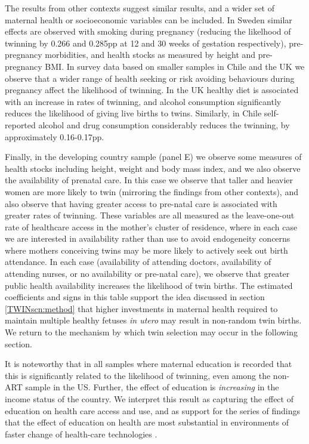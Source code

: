 \documentclass[subeqn]{article}
\begin{document}
\begin{spacing}{1.4}
The results from other contexts suggest similar results, and a wider set of
maternal health or socioeconomic variables can be included.  In Sweden similar
effects are observed with smoking during pregnancy (reducing the likelhood of
twinning by 0.266 and 0.285pp at 12 and 30 weeks of gestation respectively),
pre-pregnancy morbidities, and health stocks as measured by height and pre-%
pregnancy BMI.  In survey data based on smaller samples in Chile and the UK
we observe that a wider range of health seeking or risk avoiding behaviours
during pregnancy affect the likelihood of twinning.  In the UK healthy diet
is associated with an increase in rates of twinning, and alcohol consumption
significantly reduces the likelihood of giving live births to twins. Similarly,
in Chile self-reported alcohol and drug consumption considerably reduces the
twinning, by approximately 0.16-0.17pp.

Finally, in the developing country sample (panel E) we observe some measures of
health stocks including height, weight and body mass index, and we also observe
the availability of prenatal care.  In this case we observe that taller and
heavier women are more likely to twin (mirroring the findings from other
contexts), and also observe that having greater access to pre-natal care is
associated with greater rates of twinning.  These variables are all measured
as the leave-one-out rate of healthcare access in the mother's cluster of
residence, where in each case we are interested in availability rather than
use to avoid endogeneity concerns where mothers conceiving twins may be more
likely to actively seek out birth attendance.  In each case (availability
of attending doctors, availability of attending nurses, or no availability or
pre-natal care), we observe that greater public health availability increases
the likelihood of twin births.  The estimated coefficients and signs in this
table support the idea discussed in section \ref{TWINscn:method} that higher
investments in maternal health required to maintain multiple healthy fetuses
\emph{in utero} may result in non-random twin births. We return to the
mechanism by which twin selection may occur in the following section.

It is noteworthy that in all samples where maternal education is recorded that
this is significantly related to the likelihood of twinning, even among the
non-ART sample in the US.  Further, the effect of education is \emph{increasing}
in the income status of the country.  We interpret this result as capturing the
effect of education on health care access and use, and as support for the series
of findings that the effect of education on health are most substantial in
environments of faster change of health-care technologies \citep{LlerasMuney2005,
CutlerLlerasMuney2010}.


\end{spacing}
\end{document}
